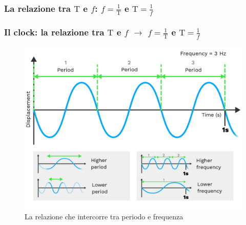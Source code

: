 \subsubsection[La relazione tra $\mathrm{T}$ e $f$: $f = \frac{1}{\mathrm{T}}$ e $\mathrm{T} = \frac{1}{f}$]{La relazione tra $\mathrm{T}$ e $f$: $f = \frac{1}{\mathrm{T}}$ e $\mathrm{T} = \frac{1}{f}$}
\begin{frame}
	\frametitle{Il clock: la relazione tra $\mathrm{T}$ e $f$ $\rightarrow$ $f = \frac{1}{\mathrm{T}}$ e $\mathrm{T} = \frac{1}{f}$}
		
	\begin{figure}[!htbp]
		\centering 
		\includegraphics[width=0.82\linewidth]{images/2_elettronica/period_frequency.png}
		\caption{La relazione che intercorre tra periodo e frequenza}
		\label{fig:electronics_period_frequency}
	\end{figure}
\end{frame}


